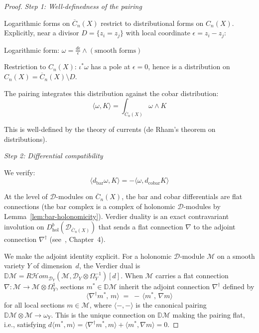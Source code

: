 \begin{proof}
\emph{Step 1: Well-definedness of the pairing}

Logarithmic forms on $\overline{C}_n(X)$ restrict to distributional 
forms on $C_n(X)$. Explicitly, near a divisor $D = \{z_i = z_j\}$ with local 
coordinate $\epsilon = z_i - z_j$:

Logarithmic form: $\omega = \frac{d\epsilon}{\epsilon} \wedge (\text{smooth forms})$

Restriction to $C_n(X)$: $\iota^*\omega$ has a pole at $\epsilon = 0$, hence is 
a distribution on $C_n(X) = \overline{C}_n(X) \setminus D$.

The pairing integrates this distribution against the cobar distribution:
\[\langle \omega, K \rangle = \int_{\overline{C}_n(X)} \omega \wedge K\]

This is well-defined by the theory of currents (de Rham's theorem on distributions).

\emph{Step 2: Differential compatibility}

We verify:
\[\langle d_{\text{bar}}\omega, K \rangle = -\langle \omega, d_{\text{cobar}}K \rangle\]

At the level of $\mathcal{D}$-modules on $\overline{C}_n(X)$, the bar and cobar differentials are flat connections (the bar complex is a complex of holonomic $\mathcal{D}$-modules by Lemma~\ref{lem:bar-holonomicity}).  Verdier duality is an exact contravariant involution on $D^b_{\mathrm{hol}}(\mathcal{D}_{\overline{C}_n(X)})$ that sends a flat connection $\nabla$ to the adjoint connection $\nabla^\dagger$ (see~\cite{KS90}, Chapter~4).

We make the adjoint identity explicit.  For a holonomic $\mathcal{D}$-module $\mathcal{M}$ on a smooth variety $Y$ of dimension~$d$, the Verdier dual is $\mathbb{D}\mathcal{M} = R\mathcal{H}\!\mathit{om}_{\mathcal{D}_Y}(\mathcal{M}, \mathcal{D}_Y \otimes \Omega_Y^{-1})[d]$.  When $\mathcal{M}$ carries a flat connection $\nabla \colon \mathcal{M} \to \mathcal{M} \otimes \Omega^1_Y$, sections $m^* \in \mathbb{D}\mathcal{M}$ inherit the adjoint connection $\nabla^\dagger$ defined by
\[\langle \nabla^\dagger m^*,\, m \rangle \;=\; -\,\langle m^*,\, \nabla m \rangle\]
for all local sections $m \in \mathcal{M}$, where $\langle -,- \rangle$ is the canonical pairing $\mathbb{D}\mathcal{M} \otimes \mathcal{M} \to \omega_Y$.  This is the unique connection on $\mathbb{D}\mathcal{M}$ making the pairing flat, i.e., satisfying $d\langle m^*, m\rangle = \langle \nabla^\dagger m^*, m\rangle + \langle m^*, \nabla m\rangle = 0$.


\end{proof}
